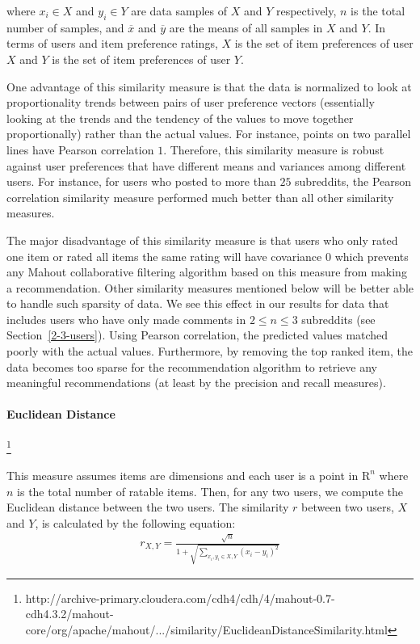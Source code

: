 \documentclass{article}
\begin{document}
where $x_i \in X$ and $y_i \in Y$ are data samples of $X$ and $Y$ respectively, $n$ is the total number of samples,
and $\overline{x}$ and $\overline{y}$ are the means of all samples in $X$ and $Y$. In terms of users and 
item preference ratings, $X$ is the set of item preferences of user $X$ and $Y$ is the set of item 
preferences of user $Y$. 

One advantage of this similarity measure is that the data is normalized to look at proportionality trends between 
pairs of user preference vectors (essentially looking at the trends and the tendency of the values to move 
together proportionally) rather than the actual values. For instance, points on two parallel lines have Pearson 
correlation $1$. Therefore, this similarity measure is robust against user preferences that have different means and variances among different users. For instance, for users who
posted to more than $25$ subreddits, the Pearson correlation similarity measure performed much
better than all other similarity measures.

The major disadvantage of this similarity measure is that users who only rated one item or rated all items the 
same rating will have covariance $0$ which prevents any Mahout collaborative filtering algorithm based 
on this measure from making a recommendation. Other similarity measures mentioned below will be better able
to handle such sparsity of data. We see this effect in our results for data that includes users who have
only made comments in $2 \leq n \leq 3$ subreddits (see Section~\ref{2-3-users}). 
Using Pearson correlation, the predicted values matched poorly
with the actual values. Furthermore, by removing the top ranked item, the data becomes too sparse for the recommendation algorithm to retrieve any meaningful recommendations (at least by the precision and recall measures).

\paragraph{Euclidean Distance}\footnote{http://archive-primary.cloudera.com/cdh4/cdh/4/mahout-0.7-cdh4.3.2/mahout-core/org/apache/mahout/.../similarity/EuclideanDistanceSimilarity.html}

This measure assumes items are dimensions and each user is a point in $\mathrm{R}^n$ where $n$ is the total
number of ratable items. Then, for any two users, we compute the Euclidean distance between the two users.
The similarity $r$ between two users, $X$ and $Y$, is calculated by the following equation: \begin{align*}
r_{X, Y} = \frac{\sqrt{n}}{1 + \sqrt{\sum_{x_i, y_i \in X, Y} (x_i - y_i)^2}}
\end{align*}
\end{document}
